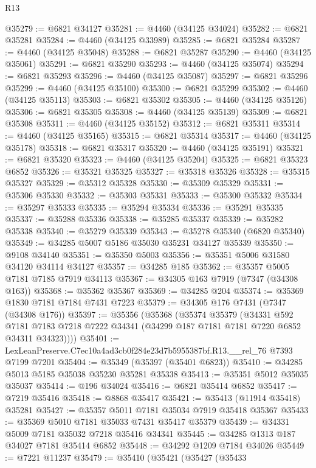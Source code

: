 \begin{lexlean}{R13}
\begin{coremodule}
@35279 := @6821 @34127
@35281 := @4460 (@34125 @34024)
@35282 := @6821 @35281
@35284 := @4460 (@34125 @33989)
@35285 := @6821 @35284
@35287 := @4460 (@34125 @35048)
@35288 := @6821 @35287
@35290 := @4460 (@34125 @35061)
@35291 := @6821 @35290
@35293 := @4460 (@34125 @35074)
@35294 := @6821 @35293
@35296 := @4460 (@34125 @35087)
@35297 := @6821 @35296
@35299 := @4460 (@34125 @35100)
@35300 := @6821 @35299
@35302 := @4460 (@34125 @35113)
@35303 := @6821 @35302
@35305 := @4460 (@34125 @35126)
@35306 := @6821 @35305
@35308 := @4460 (@34125 @35139)
@35309 := @6821 @35308
@35311 := @4460 (@34125 @35152)
@35312 := @6821 @35311
@35314 := @4460 (@34125 @35165)
@35315 := @6821 @35314
@35317 := @4460 (@34125 @35178)
@35318 := @6821 @35317
@35320 := @4460 (@34125 @35191)
@35321 := @6821 @35320
@35323 := @4460 (@34125 @35204)
@35325 := @6821 @35323 @6852
@35326 := @35321 @35325
@35327 := @35318 @35326
@35328 := @35315 @35327
@35329 := @35312 @35328
@35330 := @35309 @35329
@35331 := @35306 @35330
@35332 := @35303 @35331
@35333 := @35300 @35332
@35334 := @35297 @35333
@35335 := @35294 @35334
@35336 := @35291 @35335
@35337 := @35288 @35336
@35338 := @35285 @35337
@35339 := @35282 @35338
@35340 := @35279 @35339
@35343 := @35278 @35340 (@6820 @35340)
@35349 := @34285 @5007 @5186 @35030 @35231 @34127 @35339
@35350 := @9108 @34140
@35351 := @35350 @5003
@35356 := @35351 @5006 @31580 @34120 @34114 @34127
@35357 := @34285 @185
@35362 := @35357 @5005 @7181 @7185 @7919 @34113
@35367 := @34305 @163 @7919 (@7347 (@34308 @163))
@35368 := @35362 @35367
@35369 := @34285 @204
@35374 := @35369 @1830 @7181 @7184 @7431 @7223
@35379 := @34305 @176 @7431 (@7347 (@34308 @176))
@35397 := @35356
    (@35368
      (@35374
        @35379
        (@34331
          @592
          @7181
          @7183
          @7218
          @7222
          @34341
          (@34299 @187 @7181 @7181 @7220 @6852 @34311 @34323))))
@35401 := LexLeanPreserve.C7ec10a4ad3cb0f284e23d7b5955387bf.R13.__rel_76 @7393 @7199 @7201
@35404 := @35349 (@35397 (@35401 @6823))
@35410 := @34285 @5013 @5185 @35038 @35230 @35281 @35338
@35413 := @35351 @5012 @35035 @35037
@35414 := @196 @34024
@35416 := @6821 @35414 @6852
@35417 := @7219 @35416
@35418 := @8868 @35417
@35421 := @35413 (@11914 @35418) @35281
@35427 := @35357 @5011 @7181 @35034 @7919 @35418 @35367
@35433 := @35369 @5010 @7181 @35033 @7431 @35417 @35379
@35439 := @34331 @5009 @7181 @35032 @7218 @35416 @34341
@35445 := @34285 @1313 @187 @34027 @7181 @35414 @6852
@35448 := @34292 @1209 @7184 @34026
@35449 := @7221 @11237
@35479 := @35410
    (@35421
      (@35427
        (@35433

\end{coremodule}
\end{lexlean}
